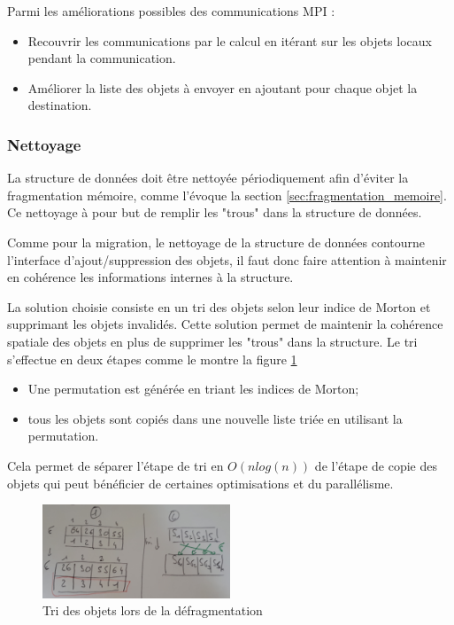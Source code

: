 Parmi les améliorations possibles des communications MPI :
\begin{itemize}
\item Recouvrir les communications par le calcul en itérant sur les objets locaux pendant la communication.
\item Améliorer la liste des objets à envoyer en ajoutant pour chaque objet la destination.
\end{itemize}

\subsubsection{Nettoyage}

La structure de données doit être nettoyée périodiquement afin d'éviter la fragmentation mémoire, comme l'évoque la section \ref{sec:fragmentation_memoire}. Ce nettoyage à pour but de remplir les "trous" dans la structure de données. 

Comme pour la migration, le nettoyage de la structure de données contourne l'interface d'ajout/suppression des objets, il faut donc faire attention à maintenir en cohérence les informations internes à la structure.

La solution choisie consiste en un tri des objets selon leur indice de Morton et supprimant les objets invalidés. Cette solution permet de maintenir la cohérence spatiale des objets en plus de supprimer les "trous" dans la structure. Le tri s'effectue en deux étapes comme le montre la figure \ref{fig:nettoyage_tri}

\begin{itemize}
	\item {} Une permutation est générée en triant les indices de Morton;
	\item {} tous les objets sont copiés dans une nouvelle liste triée en utilisant la permutation.
\end{itemize}
Cela permet de séparer l'étape de tri en $O(nlog(n))$ de l'étape de copie des objets qui peut bénéficier de certaines optimisations et du parallélisme.

\begin{figure}
	\centering
	\includegraphics[width=0.5\textwidth]{img/nettoyage_tri}
	\caption{Tri des objets lors de la défragmentation}
	\label{fig:nettoyage_tri}
\end{figure}

